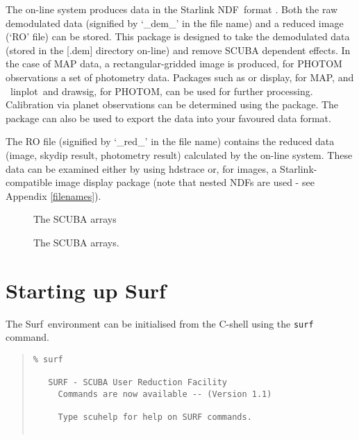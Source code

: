 \documentclass[twoside,11pt]{article}
\newcommand{\scusoft}          {{\sc Surf}}
\newcommand{\Kappa}{\xref{{\sc{Kappa}}}{sun95}{}}
\newcommand{\gaia}{\xref{{\sc{Gaia}}}{sun214}{}}
\newcommand{\convert}{\xref{{\sc{Convert}}}{sun55}{}}
\newcommand{\fluxes}{\xref{{\sc{Fluxes}}}{sun213}{}}
\newcommand{\ndf}{\xref{NDF}{sun33}{}}
\newcommand{\task}[1]{{\sf #1}}
\newcommand{\display}{\xref{\task{display}}{sun95}{DISPLAY}}
\newcommand{\linplot}{\xref{\task{linplot}}{sun95}{LINPLOT}}
\newcommand{\drawsig}{\xref{\task{drawsig}}{sun95}{DRAWSIG}}
\newcommand{\hdstrace}{\xref{\task{hdstrace}}{sun102}{}}
\newenvironment{myquote}{\begin{quote}\begin{small}}{\end{small}\end{quote}}
\newenvironment{latexonly}{}{}
\newcommand{\htmlimage}[1]{}
\newcommand{\xref}[3]{#1}
\newcommand{\xlabel}[1]{}
\begin{document}
The on-line system produces data in the Starlink \ndf\ format \cite{ndf}.
Both the raw demodulated data (signified by `\_dem\_' in the file name) and a
reduced image (`RO' file) can be stored.  This package is designed to take the
demodulated data (stored in the [.dem] directory on-line) and remove SCUBA
dependent effects. In the case of MAP data, a rectangular-gridded image is
produced, for PHOTOM observations a set of photometry data. Packages such as
\gaia \cite{gaia} or \Kappa\cite{kappa} \display, for MAP, and \Kappa\
\linplot\ and \drawsig, for PHOTOM, can be used for further
processing. Calibration via planet observations can be determined using the
\fluxes \cite{fluxes} package.  The \convert \cite{convert} package can
also be used to export the data into your favoured data format.

The RO file (signified by `\_red\_' in the file name) contains the reduced
data (image, skydip result, photometry result) calculated by the on-line
system. These data can be examined either by using \hdstrace\cite{hdstrace} or, for images, a Starlink-compatible image display
package (note that nested NDFs are used - see Appendix \ref{filenames}).

\begin{latexonly}
\begin{center}
\begin{figure}
\hspace*{20mm}
\caption{The SCUBA arrays}
\label{arrays}
\end{figure}
\end{center}
\end{latexonly}

\begin{htmlonly}
\begin{figure}
\htmlimage{scale=0.65}
\caption{The SCUBA arrays.}
\end{figure}
\label{arrays}

\end{htmlonly}

\section{\xlabel{startup}Starting up \scusoft \label{startup}}

The \scusoft\ environment can be initialised from the C-shell using the
\texttt{surf} command.

\begin{myquote}
\begin{verbatim}
% surf
 
   SURF - SCUBA User Reduction Facility
     Commands are now available -- (Version 1.1)
 
     Type scuhelp for help on SURF commands.
 
\end{verbatim}
\end{myquote}
\end{document}

